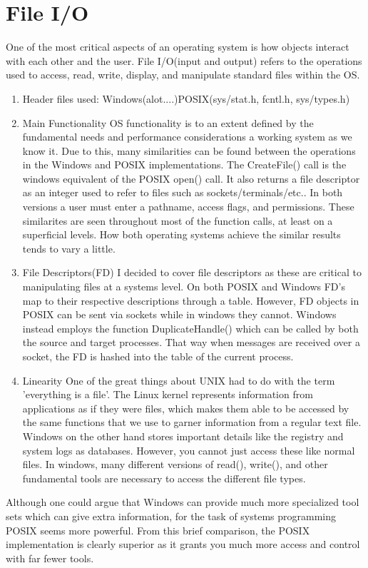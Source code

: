 \documentclass[letterpaper,10pt,titlepage]{article}
\begin{document}
\section{File I/O}
	One of the most critical aspects of an operating system is how objects interact with 
each other and the user. File I/O(input and output) refers to the operations used to access,
read, write, display, and manipulate standard files within the OS. 
	
\begin{enumerate}
  \item Header files used: Windows(alot....)\newline			POSIX(sys/stat.h, fcntl.h, sys/types.h)
  
  \item Main Functionality \newline
	OS functionality is to an extent defined by the fundamental needs and performance considerations 
a working system as we know it. Due to this, many similarities can be found between the operations
in the Windows and POSIX implementations. The CreateFile() call is the windows equivalent of the POSIX open()
call. It also returns a file descriptor as an integer used to refer to files such as sockets/terminals/etc..
In both versions a user must enter a pathname, access flags, and permissions. These similarites are seen throughout
most of the function calls, at least on a superficial levels. How both operating systems achieve the similar results 
tends to vary a little. 	

  \item File Descriptors(FD) \newline
I decided to cover file descriptors as these are critical to manipulating files at a systems level.
On both POSIX and Windows FD's map to their respective descriptions through a table. 
However, FD objects in POSIX can be sent via sockets while in windows they cannot. Windows instead
employs the function DuplicateHandle() which can be called by both the source and target processes. That
way when messages are received over a socket, the FD is hashed into the table of the current process.

  \item Linearity \newline
	One of the great things about UNIX had to do with the term 'everything is a file'. The Linux kernel 
represents information from applications as if they were files, which makes them able to be accessed by 
the same functions that we use to garner information from a regular text file. Windows on the other hand
stores important details like the registry and system logs as databases. However, you cannot just access 
these like normal files. In windows, many different versions of read(), write(), and other fundamental tools
are necessary to access the different file types.

\end{enumerate}
 Although one could argue that Windows can provide much more specialized tool sets which can give extra
information, for the task of systems programming POSIX seems more powerful. From this brief comparison,
 the POSIX implementation is clearly superior as it grants you much more access and control
with far fewer tools.
\end{document}
